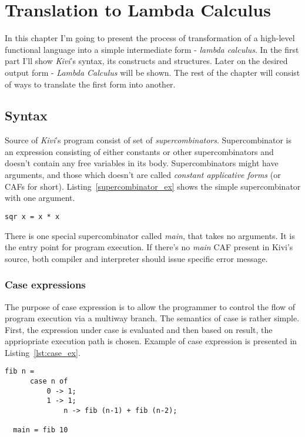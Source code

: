 \documentclass[a4paper]{report}
\begin{document}
\chapter{Translation to Lambda Calculus}

In this chapter I'm going to present the process of transformation of a
high-level functional language into a simple intermediate form - \textit{lambda
calculus}. In the first part I'll show \textit{Kivi}'s syntax, its
constructs and structures. Later on the desired output form -
\textit{Lambda Calculus} will be shown. The rest of the chapter will
consist of ways to translate the first form into another.

\section{Syntax}
Source of \textit{Kivi}'s program consist of set of
\textit{supercombinators}\cite{wiki:supercombinator}. Supercombinator is an
expression consisting of either constants or other supercombinators and
doesn't contain any free variables in its body. Supercombinators might have
arguments, and those which doesn't are called \textit{constant applicative forms}
(or CAFs for short). Listing~\ref{supercombinator_ex} shows the simple
supercombinator with one argument.

\begin{lstlisting}[label=supercombinator_ex,caption={Simple supercombinator.}]
  sqr x = x * x
\end{lstlisting}

There is one special supercombinator called \textit{main}, that takes no
arguments. It is the entry point for program execution. If there's no
\textit{main} CAF present in Kivi's source, both compiler and interpreter
should issue specific error message.

\subsection{Case expressions}
The purpose of case expression is to allow the programmer to control the flow
of program execution via a multiway branch. The semantics of case is rather
simple. First, the expression under case is evaluated and then based on result,
the appriopriate execution path is chosen. Example of case expression is
presented in Listing~\ref{lst:case_ex}.

\begin{lstlisting}[label=lst:case_ex,caption={Fibonacci with case}]
  fib n =
      case n of
          0 -> 1;
          1 -> 1;
              n -> fib (n-1) + fib (n-2);

  main = fib 10
\end{lstlisting}
\end{document}
